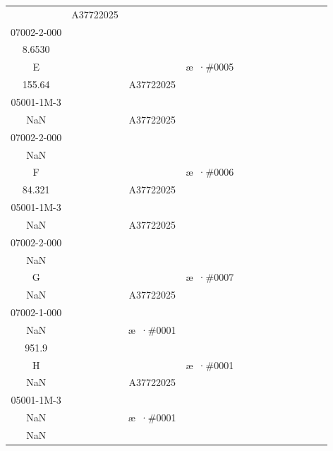 \documentclass[UTF8,10pt,a4paper,fontset=fandol]{ctexart}
\newcommand{\fieldvalue}[1]{#1}
\begin{document}
\begin{tabular}{c|*{12}{c|}}
&%
\fieldvalue{\scriptsize A37722025\\07002-2-000\\8.6530}&
&&&&\\ \hline
E&&&%
\fieldvalue{\scriptsize æ ·\#0005\\155.64}&
&%
\fieldvalue{\scriptsize A37722025\\05001-1M-3\\NaN}&
&%
\fieldvalue{\scriptsize A37722025\\07002-2-000\\NaN}&
&&&&\\ \hline
F&&&%
\fieldvalue{\scriptsize æ ·\#0006\\84.321}&
&%
\fieldvalue{\scriptsize A37722025\\05001-1M-3\\NaN}&
&%
\fieldvalue{\scriptsize A37722025\\07002-2-000\\NaN}&
&&&&\\ \hline
G&&&%
\fieldvalue{\scriptsize æ ·\#0007\\NaN}&
&%
\fieldvalue{\scriptsize A37722025\\07002-1-000\\NaN}&
&%
\fieldvalue{\scriptsize æ ·\#0001\\951.9}&
&&&&\\ \hline
H&&&%
\fieldvalue{\scriptsize æ ·\#0001\\NaN}&
&%
\fieldvalue{\scriptsize A37722025\\05001-1M-3\\NaN}&
&%
\fieldvalue{\scriptsize æ ·\#0001\\NaN}&
&&&&\\ \hline
\end{tabular}
\end{document}
